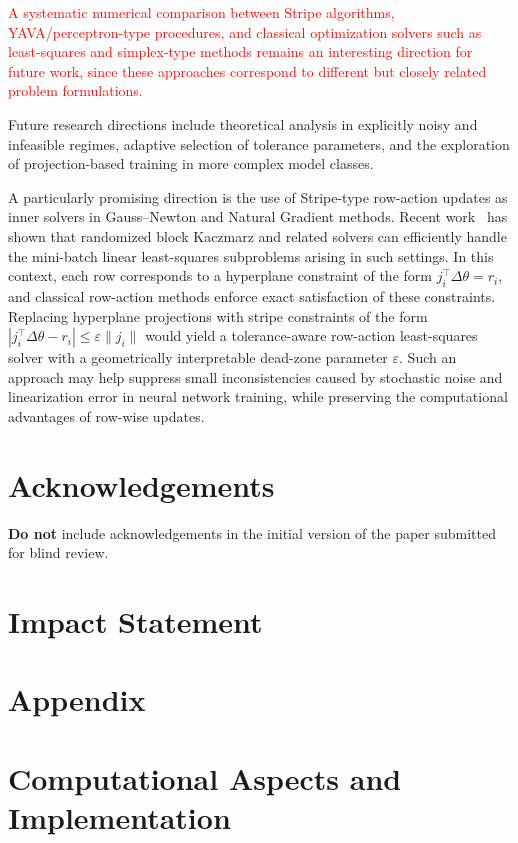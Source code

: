 \documentclass[a4paper,fleqn]{cas-sc}
\begin{document}
\textcolor{red}{
A systematic numerical comparison between Stripe algorithms,
YAVA/perceptron-type procedures, and classical optimization
solvers such as least-squares and simplex-type methods remains
an interesting direction for future work, since these approaches
correspond to different but closely related problem formulations.
}

Future research directions include theoretical analysis in explicitly noisy and infeasible regimes, adaptive selection of tolerance parameters, and the exploration of projection-based training in more complex model classes.

A particularly promising direction is the use of Stripe-type row-action updates as inner solvers in Gauss–Newton and Natural Gradient methods. Recent work~\cite{goldshlager2025worth} has shown that randomized block Kaczmarz and related solvers can efficiently handle the mini-batch linear least-squares subproblems arising in such settings. In this context, each row corresponds to a hyperplane constraint of the form $j_i^\top \Delta\theta = r_i$, and classical row-action methods enforce exact satisfaction of these constraints. Replacing hyperplane projections with stripe constraints of the form
$
| j_i^\top \Delta\theta - r_i | \le \varepsilon \|j_i\|
$
would yield a tolerance-aware row-action least-squares solver with a geometrically interpretable dead-zone parameter $\varepsilon$. Such an approach may help suppress small inconsistencies caused by stochastic noise and linearization error in neural network training, while preserving the computational advantages of row-wise updates.

\section*{Acknowledgements}
\textbf{Do not} include acknowledgements in the initial version of the paper submitted for blind review.

\section*{Impact Statement}


\newpage
\appendix
\onecolumn
\section{Appendix}
\label{sec:appendix}
\section{Computational Aspects and Implementation}
\label{sec:implementation}
\end{document}

